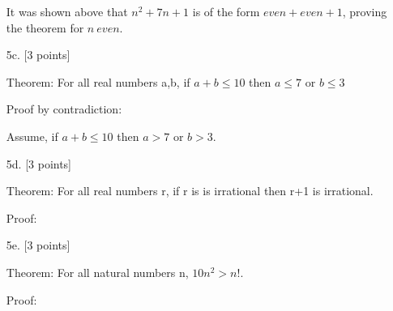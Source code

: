 \documentclass[11pt,letterpaper]{article}
\begin{document}
\begin{enumerate}
It was shown above that $n^2 + 7n + 1$ is of the form $even + even + 1$, proving the theorem for $n \: even$.


\bigskip
\item[5c.] [3 points]

Theorem:
For all real numbers a,b, if $a+b \leq 10 $ then $a \leq 7$ or $b \leq 3$

Proof by contradiction:

Assume, if $a+b \leq 10 $ then $a > 7$ or $b > 3$.



\bigskip
\item[5d.] [3 points]

Theorem:
For all real numbers r, if r is is irrational then r+1 is irrational.

Proof:

\bigskip
\item[5e.] [3 points]

Theorem:
For all natural numbers n, $10n^2 > n!$.

Proof:


\end{enumerate}
\end{document}
